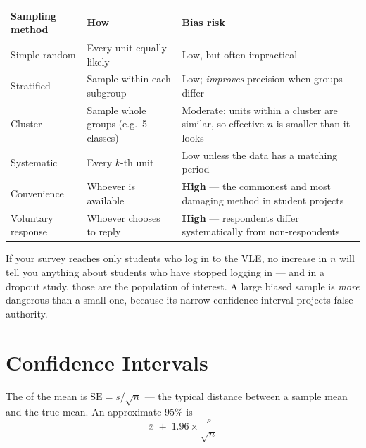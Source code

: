 \begin{longtable}{@{}L{3.0cm}L{5.2cm}L{6.3cm}@{}}
\toprule
{}
\textbf{Sampling method} & \textbf{How} & \textbf{Bias risk} \\
\midrule
\endhead
Simple random & Every unit equally likely & Low, but often impractical \\
Stratified & Sample within each subgroup & Low; \emph{improves} precision when groups differ \\
Cluster & Sample whole groups (e.g.\ 5 classes) & Moderate; units within a cluster are similar, so effective $n$ is smaller than it looks \\
Systematic & Every $k$-th unit & Low unless the data has a matching period \\
Convenience & Whoever is available & \textbf{High} --- the commonest and most damaging method in student projects \\
Voluntary response & Whoever chooses to reply & \textbf{High} --- respondents differ systematically from non-respondents \\
\bottomrule
\end{longtable}

\begin{alertbox}
If your survey reaches only students who log in to the VLE, no increase in $n$
will tell you anything about students who have stopped logging in --- and in a
dropout study, those are the population of interest. A large biased sample is
\emph{more} dangerous than a small one, because its narrow confidence interval
projects false authority.
\end{alertbox}

\section{Confidence Intervals}

\begin{definitionbox}
The  of the mean is $\text{SE} = s/\sqrt{n}$ --- the typical
distance between a sample mean and the true mean. An approximate 95\%
 is
\[
\bar{x} \;\pm\; 1.96 \times \frac{s}{\sqrt{n}}
\]
\end{definitionbox}

